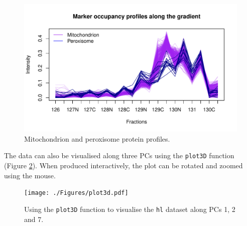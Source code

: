 \begin{figure}[!ht]
  \centering
\begin{knitrout}
\color{fgcolor}\begin{kframe}
\begin{alltt}
 \hlkwb{<-} \hlstd{hl[,} \hlopt{$}\hlstd{Iodixonal.Density)]}
\hlstd{(hlo[}\hlopt{$} \hlopt{==} \hlstd{, ],}
          \hlstd{=} \hlstd{,}  \hlstd{=} \hlstd{)}
\hlstd{(} \hlstd{=} \hlstd{)}
\hlstd{(}\hlstd{(}\hlstd{(hlo[}\hlopt{$} \hlopt{==} \hlstd{, ])),}
          \hlstd{=} \hlstd{,}  \hlstd{=} \hlstd{,}  \hlstd{=} \hlstd{)}
\hlstd{(}\hlstd{,} \hlstd{(}\hlstd{,} \hlstd{),}
        \hlstd{=} \hlstd{,}  \hlstd{=} \hlstd{(}\hlstd{,} \hlstd{),}  \hlstd{=} \hlstd{)}
\end{alltt}
\end{kframe}
\includegraphics[width=.6\textwidth]{figure/plotDist-1} 

\end{knitrout}
  \caption{Mitochondrion and peroxisome protein profiles.}
  \label{fig:plotDist2}
\end{figure}


The data can also be visualised along three PCs using the
\texttt{plot3D} function (Figure \ref{fig:plotmarkers3d}). When
produced interactively, the plot can be rotated and zoomed using the
mouse.

\begin{figure}[htb]
  \centering
\begin{knitrout}
\color{fgcolor}\begin{kframe}
\begin{alltt}
  \hlstd{=} \hlstd{(}\hlstd{,} \hlstd{,} \hlstd{))}
\end{alltt}
\end{kframe}
\end{knitrout}
  \texttt{[image: ./Figures/plot3d.pdf]}
  \caption{Using the \texttt{plot3D} function to visualise the
    \texttt{hl} dataset along PCs 1, 2 and 7. }
  \label{fig:plotmarkers3d}
\end{figure}

